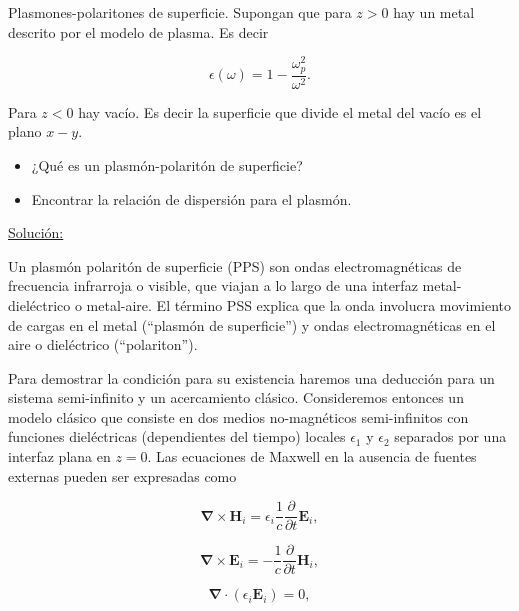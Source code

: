 \documentclass[a4paper,11pt]{article}
\numberwithin{equation}{section}
\begin{document}
Plasmones-polaritones de superficie. Supongan que para $z > 0$ hay un metal descrito por el modelo de plasma. Es decir 

$$
\epsilon(\omega) = 1 - \frac{\omega_p^2}{\omega^2}.
$$

Para $z < 0$ hay vacío. Es decir la superficie que divide el metal del vacío es el plano $x - y$.

\begin{itemize}
 \item ¿Qué es un plasmón-polaritón de superficie?
 \item Encontrar la relación de dispersión para el plasmón.
\end{itemize}

\vspace{.3cm}

\underline{Solución:} \vspace{.3cm}

Un plasmón polaritón de superficie (PPS) son ondas electromagnéticas de frecuencia
infrarroja o visible, que viajan a lo largo de una interfaz metal-dieléctrico o 
metal-aire. El término PSS explica que la onda involucra movimiento de cargas en 
el metal (``plasmón de superficie'') y ondas electromagnéticas en el aire 
o dieléctrico (``polariton''). 

\vspace{.3cm}

Para demostrar la condición para su existencia haremos una deducción para un 
sistema semi-infinito y un acercamiento clásico. Consideremos entonces un modelo 
clásico que consiste en dos medios no-magnéticos semi-infinitos con funciones 
dieléctricas (dependientes del tiempo) locales $\epsilon_1$ y $\epsilon_2$ 
separados por una interfaz plana en $z = 0$. Las ecuaciones de Maxwell en la 
ausencia de fuentes externas pueden ser expresadas como 

\begin{equation}
 \pmb{\nabla} \times \mathbf{H}_i = \epsilon_i \frac{1}{c} \frac{\partial}{\partial t} 
 \mathbf{E}_i,
\end{equation}

\begin{equation}
 \pmb{\nabla} \times \mathbf{E}_i = - \frac{1}{c} \frac{\partial}{\partial t} 
 \mathbf{H}_i,
\end{equation}

\begin{equation}
 \pmb{\nabla} \cdot (\epsilon_i \mathbf{E}_i) = 0,
\end{equation}
\end{document}
